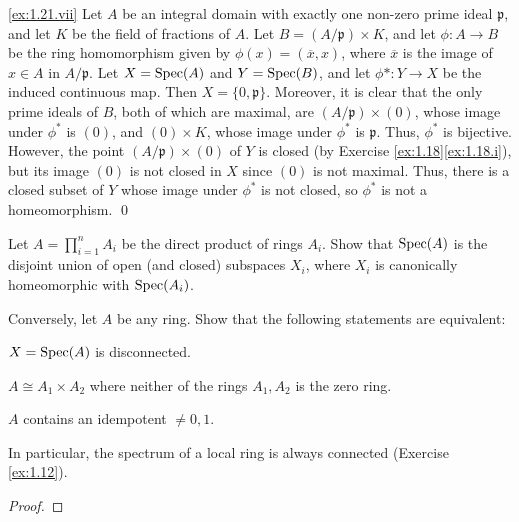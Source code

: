 \noindent
\ref{ex:1.21.vii}
Let $A$ be an integral domain with exactly one non-zero prime ideal $\mathfrak p$, and let $K$ be the field of fractions of $A$.
Let $B = (A/\mathfrak p) \times K$, and let $\phi : A \to B$ be the ring homomorphism given by $\phi(x) = (\overline x, x)$, where $\overline x$ is the image of $x\in A$ in $A/\mathfrak p$.
Let $X = \operatorname{Spec}(A)$ and $Y = \operatorname{Spec}(B)$, and let $\phi* : Y \to X$ be the induced continuous map.
Then $X = \{0,\mathfrak p\}$.
Moreover, it is clear that the only prime ideals of $B$, both of which are maximal, are $(A/\mathfrak p) \times (0)$, whose image under $\phi^*$ is $(0)$, and $(0) \times K$, whose image under $\phi^*$ is $\mathfrak p$.
Thus, $\phi^*$ is bijective.
However, the point $(A/\mathfrak p) \times (0)$ of $Y$ is closed (by Exercise \ref{ex:1.18}\ref{ex:1.18.i}), but its image $(0)$ is not closed in $X$ since $(0)$ is not maximal.
Thus, there is a closed subset of $Y$ whose image under $\phi^*$ is not closed, so $\phi^*$ is not a homeomorphism.
\qed










\begin{exercise}
\label{ex:1.22}
Let $A = \prod_{i=1}^n A_i$ be the direct product of rings $A_i$.
Show that $\operatorname{Spec}(A)$ is the disjoint union of open (and closed) subspaces $X_i$, where $X_i$ is canonically homeomorphic with $\operatorname{Spec}(A_i)$.

Conversely, let $A$ be any ring.
Show that the following statements are equivalent:
\begin{rlist}
\item
\label{ex:1.22.i}
$X = \operatorname{Spec}(A)$ is disconnected.
\item
\label{ex:1.22.ii}
$A \cong A_1 \times A_2$ where neither of the rings $A_1,A_2$ is the zero ring.
\item
\label{ex:1.22.iii}
$A$ contains an idempotent $\neq 0,1$.
\end{rlist}

In particular, the spectrum of a local ring is always connected (Exercise \ref{ex:1.12}).
\end{exercise}

\begin{proof}



\end{proof}











